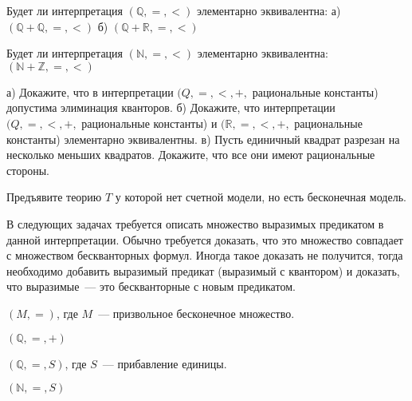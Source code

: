 \setcounter{curtask}{25}


\begin{task}
    Будет ли интерпретация $(\mathbb{Q}, =, <)$ элементарно
    эквивалентна:
    а) $(\mathbb{Q} + \mathbb{Q}, =, <)$
    б) $(\mathbb{Q} + \mathbb{R}, =, <)$
\end{task}

\begin{task}
    Будет ли интерпретация $(\mathbb{N}, =, <)$ элементарно
    эквивалентна: $(\mathbb{N} + \mathbb{Z}, =, <)$
\end{task}

\begin{task}
    а) Докажите, что в интерпретации $(Q, =, <, +,$ рациональные
    константы) допустима элиминация кванторов.
    б) Докажите, что интерпретации $(Q, =, <, +,$ рациональные
    константы) и $(\mathbb{R}, =, <, +,$ рациональные константы)
    элементарно эквивалентны.
    в) Пусть единичный квадрат разрезан на несколько меньших
    квадратов. Докажите, что все они имеют рациональные стороны.
\end{task}

\begin{task}
    Предъявите теорию $T$ у которой нет счетной модели, но есть бесконечная модель.
\end{task}


В следующих задачах требуется описать множество выразимых предикатом в
данной интерпретации. Обычно требуется доказать, что это множество
совпадает с множеством бескванторных формул. Иногда такое доказать не
получится, тогда необходимо добавить выразимый предикат (выразимый с
квантором) и доказать, что выразимые~--- это бескванторные с новым
предикатом.

\begin{task}
    $(M, =)$, где $M$~--- призвольное бесконечное множество.
\end{task}

\begin{task}
    $(\mathbb{Q}, =, +)$
\end{task}

\begin{task}
    $(\mathbb{Q}, =, S)$, где $S$~--- прибавление единицы.
\end{task}

\begin{task}
    $(\mathbb{N}, =, S)$
\end{task}
